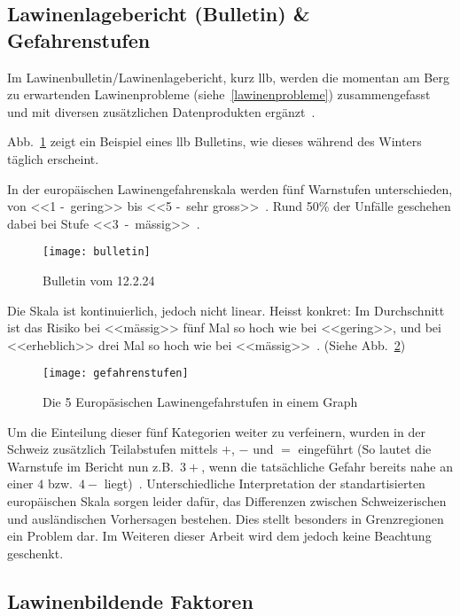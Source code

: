 \subsection{Lawinenlagebericht (Bulletin) \& Gefahrenstufen}

Im Lawinenbulletin/Lawinenlagebericht, kurz \gls{llb}, werden die momentan am Berg zu erwartenden Lawinenprobleme (siehe~\ref{lawinenprobleme}) zusammengefasst und mit diversen zusätzlichen Datenprodukten ergänzt~\cite{lawinengefskala}.

Abb.\ \ref{fig:bulletin} zeigt ein Beispiel eines \gls{llb} Bulletins, wie dieses während des Winters täglich erscheint.

In der europäischen Lawinengefahrenskala werden fünf Warnstufen unterschieden, von <<1 -~gering>> bis <<5 -~sehr gross>>~\cite{harveyrhynerschweizerlawinenkunde}\cite{lawinengefskala}.
Rund 50\% der Unfälle geschehen dabei bei Stufe <<3~-~mässig>>~\cite{achtunglawine}.

\begin{figure}[H]
  \centering
  \texttt{[image: bulletin]}
  \caption{Bulletin vom 12.2.24~\cite{slfarchiv}}\label{fig:bulletin}
\end{figure}

Die Skala ist kontinuierlich, jedoch nicht linear. Heisst konkret: 
Im Durchschnitt ist das Risiko bei <<mässig>> fünf Mal so hoch wie bei <<gering>>, und bei <<erheblich>> drei Mal so hoch wie bei <<mässig>>~\cite{sacbergspwinter}. (Siehe Abb.\ \ref{fig:llbdanger})

\begin{figure}[H]
  \centering
  \texttt{[image: gefahrenstufen]}
  \caption{Die 5 Europäsischen Lawinengefahrstufen in einem Graph}\label{fig:llbdanger}
\end{figure}
\clearpage
Um die Einteilung dieser fünf Kategorien weiter zu verfeinern, wurden in der Schweiz zusätzlich Teilabstufen mittels $+$, $-$ und $=$ eingeführt (So lautet die Warnstufe im Bericht nun z.B.\ $3+$, wenn die tatsächliche Gefahr bereits nahe an einer $4$ bzw.\ $4-$ liegt)~\cite{sacbergspwinter}.
Unterschiedliche Interpretation der standartisierten europäischen Skala sorgen leider dafür, das Differenzen zwischen Schweizerischen und ausländischen Vorhersagen bestehen. Dies stellt besonders in Grenzregionen ein Problem dar. Im Weiteren dieser Arbeit wird dem jedoch keine Beachtung geschenkt.


\subsection{Lawinenbildende Faktoren}

